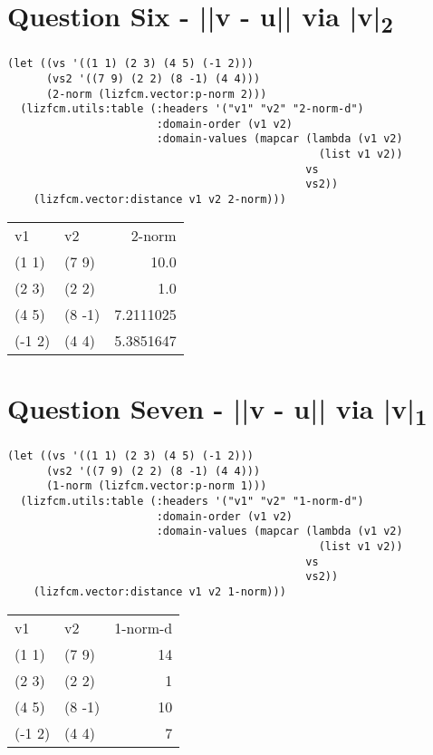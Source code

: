 \documentclass[11pt]{article}
\begin{document}
\section{Question Six - ||v - u|| via |v|\textsubscript{2}}
\label{sec:org29ec18f}
\begin{verbatim}
(let ((vs '((1 1) (2 3) (4 5) (-1 2)))
      (vs2 '((7 9) (2 2) (8 -1) (4 4)))
      (2-norm (lizfcm.vector:p-norm 2)))
  (lizfcm.utils:table (:headers '("v1" "v2" "2-norm-d")
                       :domain-order (v1 v2)
                       :domain-values (mapcar (lambda (v1 v2)
                                                (list v1 v2))
                                              vs
                                              vs2))
    (lizfcm.vector:distance v1 v2 2-norm)))
\end{verbatim}


\begin{center}
\begin{tabular}{llr}
v1 & v2 & 2-norm\\[0pt]
(1 1) & (7 9) & 10.0\\[0pt]
(2 3) & (2 2) & 1.0\\[0pt]
(4 5) & (8 -1) & 7.2111025\\[0pt]
(-1 2) & (4 4) & 5.3851647\\[0pt]
\end{tabular}
\end{center}

\section{Question Seven - ||v - u|| via |v|\textsubscript{1}}
\label{sec:org7a87810}
\begin{verbatim}
(let ((vs '((1 1) (2 3) (4 5) (-1 2)))
      (vs2 '((7 9) (2 2) (8 -1) (4 4)))
      (1-norm (lizfcm.vector:p-norm 1)))
  (lizfcm.utils:table (:headers '("v1" "v2" "1-norm-d")
                       :domain-order (v1 v2)
                       :domain-values (mapcar (lambda (v1 v2)
                                                (list v1 v2))
                                              vs
                                              vs2))
    (lizfcm.vector:distance v1 v2 1-norm)))
\end{verbatim}


\begin{center}
\begin{tabular}{llr}
v1 & v2 & 1-norm-d\\[0pt]
(1 1) & (7 9) & 14\\[0pt]
(2 3) & (2 2) & 1\\[0pt]
(4 5) & (8 -1) & 10\\[0pt]
(-1 2) & (4 4) & 7\\[0pt]
\end{tabular}
\end{center}
\end{document}
